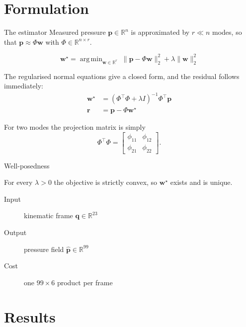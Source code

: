 \documentclass[aspectratio=43]{beamer}
\newcommand{\R}{\mathbb{R}}
\newcommand{\vect}[1]{\mathbf{#1}}
\DeclareMathOperator*{\argmin}{arg\,min}
\begin{document}
\section{Formulation}

\begin{frame}{The estimator}
  Measured pressure $\vect{p} \in \R^{n}$ is approximated by $r \ll n$ modes,
  so that $\vect{p} \approx \Phi \vect{w}$ with $\Phi \in \R^{n \times r}$.

  \[
    \vect{w}^\star = \argmin_{\vect{w} \in \R^{r}}
      \; \|\vect{p} - \Phi\vect{w}\|_2^2 + \lambda \|\vect{w}\|_2^2
  \]

  The regularised normal equations give a closed form, and the residual
  follows immediately:
  \begin{align}
    \vect{w}^\star &= (\Phi^\top \Phi + \lambda I)^{-1} \Phi^\top \vect{p} \\
    \vect{r}       &= \vect{p} - \Phi \vect{w}^\star
  \end{align}

  For two modes the projection matrix is simply
  \[
    \Phi^\top \Phi = \begin{bmatrix}
      \phi_{11} & \phi_{12} \\
      \phi_{21} & \phi_{22}
    \end{bmatrix} .
  \]
\end{frame}

\begin{frame}{Well-posedness}
  \begin{theorem}
    For every $\lambda > 0$ the objective is strictly convex, so
    $\vect{w}^\star$ exists and is unique.
  \end{theorem}

  \begin{description}
    \item[Input] kinematic frame $\vect{q} \in \R^{23}$
    \item[Output] pressure field $\hat{\vect{p}} \in \R^{99}$
    \item[Cost] one $99 \times 6$ product per frame
  \end{description}
\end{frame}

\section{Results}
\end{document}
